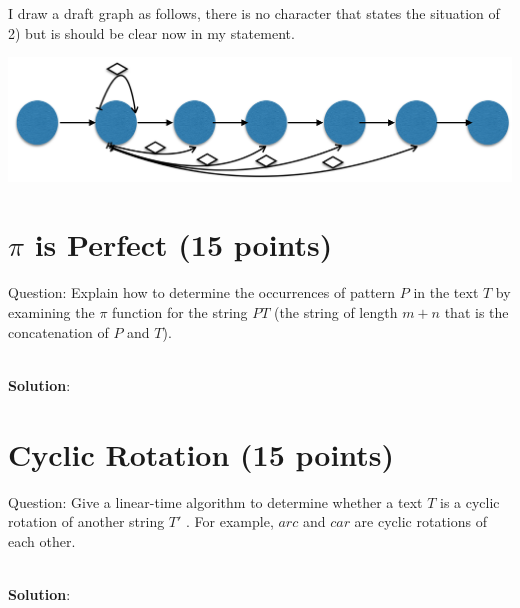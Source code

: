 \documentclass{article}
\begin{document}
I draw a draft graph as follows, there is no character that states the situation of 2) but is should be clear now in my statement.

\begin{center}
\includegraphics[scale=0.3]{hw7_3.png}
\end{center}


\section{$\pi$ is Perfect (15 points)}
Question: Explain how to determine the occurrences of pattern $P$ in the text $T$ by examining the $\pi$ function for the string $PT$ (the string of length $m+n$ that is the concatenation of $P$ and $T$).

~\\
\textbf{Solution}:\newline
\indent

\section{Cyclic Rotation (15 points)}
Question: Give a linear-time algorithm to determine whether a text $T$ is a cyclic rotation of another string $T'$ . For example, $arc$ and $car$ are cyclic rotations of each other.

~\\
\textbf{Solution}:\newline
\indent
\end{document}
